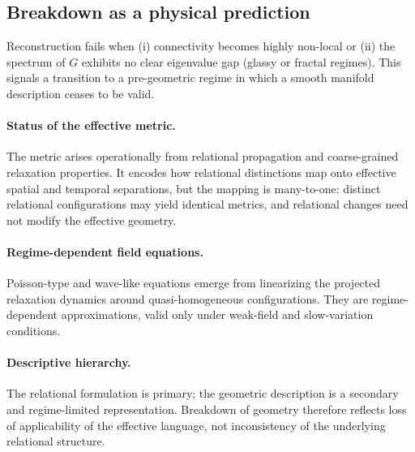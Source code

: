 \subsection{Breakdown as a physical prediction}
  \label{subsec:breakdown-as-a-physical-prediction}

  Reconstruction fails when (i) connectivity becomes highly non-local or
  (ii) the spectrum of $G$ exhibits no clear eigenvalue gap
  (glassy or fractal regimes).
  This signals a transition to a pre-geometric regime in which
  a smooth manifold description ceases to be valid.

  \paragraph{Status of the effective metric.}
    The metric arises operationally from relational propagation and
    coarse-grained relaxation properties.
    It encodes how relational distinctions map onto effective spatial
    and temporal separations, but the mapping is many-to-one:
    distinct relational configurations may yield identical metrics,
    and relational changes need not modify the effective geometry.

  \paragraph{Regime-dependent field equations.}
    Poisson-type and wave-like equations emerge from linearizing the
    projected relaxation dynamics around quasi-homogeneous configurations.
    They are regime-dependent approximations, valid only under
    weak-field and slow-variation conditions.

  \paragraph{Descriptive hierarchy.}
    The relational formulation is primary; the geometric description
    is a secondary and regime-limited representation.
    Breakdown of geometry therefore reflects loss of applicability
    of the effective language, not inconsistency of the underlying
    relational structure.
